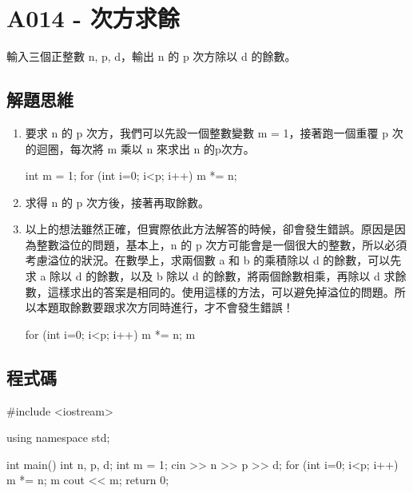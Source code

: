 \section{A014 - 次方求餘}
輸入三個正整數 n, p, d，輸出 n 的 p 次方除以 d 的餘數。
\subsection{解題思維}
\begin{enumerate}
\item 要求 n 的 p 次方，我們可以先設一個整數變數 m = 1，接著跑一個重覆 p 次的迴圈，每次將 m 乘以 n 來求出 n 的p次方。
	\begin{inside}
	int m = 1;
	for (int i=0; i<p; i++) m *= n;
	\end{inside}
\item 求得 n 的 p 次方後，接著再取餘數。
\item 以上的想法雖然正確，但實際依此方法解答的時候，卻會發生錯誤。原因是因為整數溢位的問題，基本上，n 的 p 次方可能會是一個很大的整數，所以必須考慮溢位的狀況。在數學上，求兩個數 a 和 b 的乘積除以 d 的餘數，可以先求 a 除以 d 的餘數，以及 b 除以 d 的餘數，將兩個餘數相乘，再除以 d 求餘數，這樣求出的答案是相同的。使用這樣的方法，可以避免掉溢位的問題。所以本題取餘數要跟求次方同時進行，才不會發生錯誤！
\begin{inside}
	for (int i=0; i<p; i++) { 
		m *= n;
		m %
	}
\end{inside}
\end{enumerate}

\subsection{程式碼}
\begin{cppcode}
	#include <iostream>
	
	using namespace std;
	
	int main()
	{
		int n, p, d;
		int m = 1;
		cin >> n >> p >> d;
		for (int i=0; i<p; i++) {
			m *= n;
			m %
		}
		cout << m;
		return 0;
	}
\end{cppcode}

